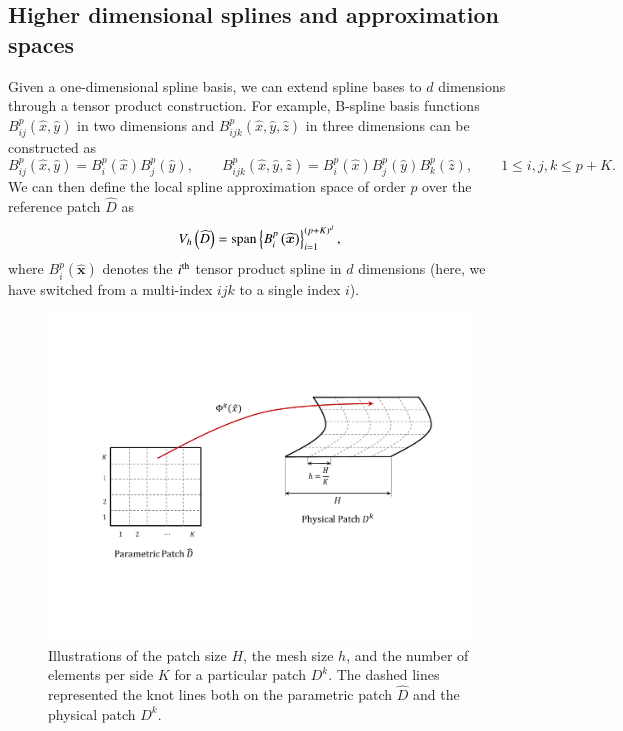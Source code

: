 \documentclass[preprint,10pt]{elsarticle}
\newcommand{\LRp}[1]{\left( #1 \right)}
\newcommand{\LRc}[1]{\left\{ #1 \right\}}
\newcommand{\reviewerTwo}[1]{#1}
\begin{document}
\subsection{Higher dimensional splines and approximation spaces}

Given a one-dimensional spline basis, we can extend spline bases to $d$ dimensions through a tensor product construction. For example, B-spline basis functions $B^{p}_{ij}(\hat{x},\hat{y})$ in two dimensions and $B^{p}_{ijk}(\hat{x},\hat{y},\hat{z})$ in three dimensions can be constructed as
\[
B^{p}_{ij}(\widehat{x},\widehat{y}) = B^p_i(\widehat{x}) B^p_j(\widehat{y}), \qquad B^{p}_{ijk}(\widehat{x},\widehat{y},\widehat{z}) = B^p_i(\widehat{x}) B^p_j(\widehat{y})B^p_k(\widehat{z}), \qquad 1 \leq i,j,k\leq p+K.
\]
We can then define the local spline approximation space of order $p$ over the reference patch $\widehat{D}$ as 
\[
V_h\LRp{\widehat{D}} = {\rm span}\LRc{B^p_{i}\LRp{\bm{\widehat{x}}}}_{i=1}^{(p+K)^d},
\]
where $B^p_i\LRp{\bm{\widehat{x}}}$ denotes the $i^{\rm th}$ tensor product spline in $d$ dimensions \reviewerTwo{(here, we have switched from a multi-index $ijk$ to a single index $i$).}

\begin{figure}[t]
\centering
\includegraphics[width=.85\textwidth]{Definitions.pdf}
\caption{{\color{forestgreen} Illustrations of the patch size $H$, the mesh size $h$, and the number of elements per side $K$ for a particular patch $D^k$.  The dashed lines represented the knot lines both on the parametric patch $\hat{D}$ and the physical patch $D^k$.}}
\label{fig:definitions}
\end{figure}
\end{document}
